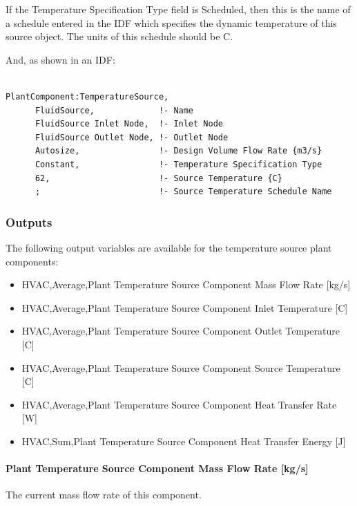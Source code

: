 If the Temperature Specification Type field is Scheduled, then this is the name of a schedule entered in the IDF which specifies the dynamic temperature of this source object. The units of this schedule should be C.

And, as shown in an IDF:

\begin{lstlisting}

PlantComponent:TemperatureSource,
      FluidSource,             !- Name
      FluidSource Inlet Node,  !- Inlet Node
      FluidSource Outlet Node, !- Outlet Node
      Autosize,                !- Design Volume Flow Rate {m3/s}
      Constant,                !- Temperature Specification Type
      62,                      !- Source Temperature {C}
      ;                        !- Source Temperature Schedule Name
\end{lstlisting}

\subsubsection{Outputs}\label{outputs-16-000}

The following output variables are available for the temperature source plant components:

\begin{itemize}
    \item
    HVAC,Average,Plant Temperature Source Component Mass Flow Rate {[}kg/s{]}
    \item
    HVAC,Average,Plant Temperature Source Component Inlet Temperature {[}C{]}
    \item
    HVAC,Average,Plant Temperature Source Component Outlet Temperature {[}C{]}
    \item
    HVAC,Average,Plant Temperature Source Component Source Temperature {[}C{]}
    \item
    HVAC,Average,Plant Temperature Source Component Heat Transfer Rate {[}W{]}
    \item
    HVAC,Sum,Plant Temperature Source Component Heat Transfer Energy {[}J{]}
\end{itemize}

\paragraph{Plant Temperature Source Component Mass Flow Rate {[}kg/s{]}}\label{plant-temperature-source-component-mass-flow-rate-kgs}

The current mass flow rate of this component.


